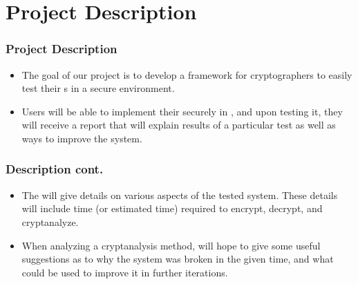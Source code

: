 \section{Project Description}


\begin{frame}
\frametitle{Project Description}
\begin{itemize}
\item The goal of our project is to develop a framework for
  cryptographers to easily test their \cs s in a
  secure environment.
\item Users will be able to implement their
  \cs{} securely in \cry, and upon testing it, they will
  receive a report that will explain results of a particular
  test as well as ways to improve the system.
\end{itemize}
\end{frame}

\begin{frame}
\frametitle{Description cont.}
\begin{itemize}
\item The will give details on various aspects of the
  tested system. These details will include time (or
  estimated time) required to encrypt, decrypt, and
  cryptanalyze.
\item When analyzing a cryptanalysis method, \cry{} will
  hope to give some useful suggestions as to why the system
  was broken in the given time, and what could be used to
  improve it in further iterations.
\end{itemize}
\end{frame}
